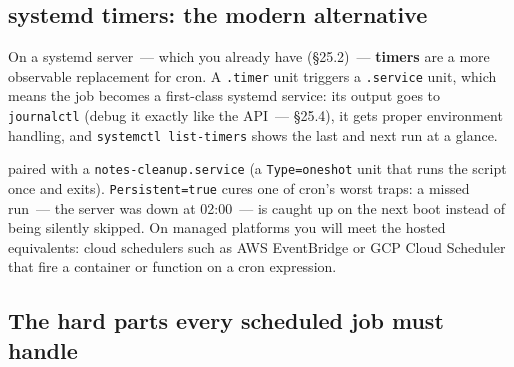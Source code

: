 \subsection*{systemd timers: the modern alternative}\label{25-process-management:systemd-timers-the-modern-alternative}

On a systemd server~--- which you already have (§25.2)~--- \textbf{timers} are a more observable replacement for cron. A \texttt{.timer} unit triggers a \texttt{.service} unit, which means the job becomes a first-class systemd service: its output goes to \texttt{journalctl} (debug it exactly like the API~--- §25.4), it gets proper environment handling, and \texttt{systemctl\ list-timers} shows the last and next run at a glance.

\begin{codebox}[short]

\begin{Shaded}
\begin{Highlighting}[]
\KeywordTok{[Unit]}
\OtherTok{=}
\KeywordTok{[Timer]}
\OtherTok{=}
\OtherTok{=}
\KeywordTok{[Install]}
\OtherTok{=}
\end{Highlighting}
\end{Shaded}

\end{codebox}

\noindent{}paired with a \texttt{notes-cleanup.service} (a \texttt{Type=oneshot} unit that runs the script once and exits). \texttt{Persistent=true} cures one of cron's worst traps: a missed run~--- the server was down at 02:00~--- is caught up on the next boot instead of being silently skipped. On managed platforms you will meet the hosted equivalents: cloud schedulers such as AWS EventBridge or GCP Cloud Scheduler that fire a container or function on a cron expression.

\subsection*{The hard parts every scheduled job must handle}\label{25-process-management:the-hard-parts-every-scheduled-job-must-handle}


